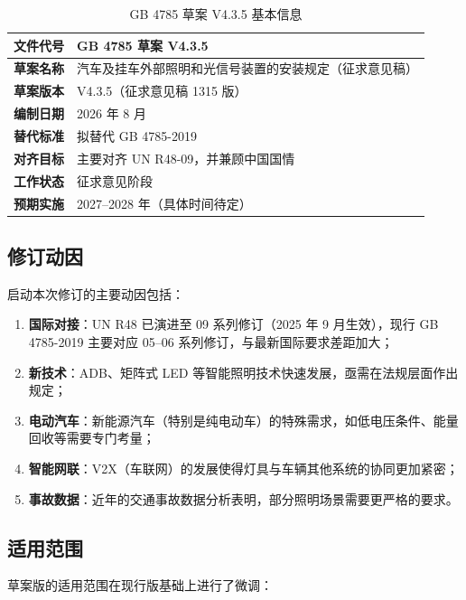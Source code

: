 \begin{table}[H]
\centering
\caption{GB 4785 草案 V4.3.5 基本信息}
\begin{tabularx}{\textwidth}{|l|X|}
\hline
\textbf{文件代号} & GB 4785 草案 V4.3.5 \\
\hline
\textbf{草案名称} & 汽车及挂车外部照明和光信号装置的安装规定（征求意见稿） \\
\hline
\textbf{草案版本} & V4.3.5（征求意见稿 1315 版） \\
\hline
\textbf{编制日期} & 2026 年 8 月 \\
\hline
\textbf{替代标准} & 拟替代 GB 4785-2019 \\
\hline
\textbf{对齐目标} & 主要对齐 UN R48-09，并兼顾中国国情 \\
\hline
\textbf{工作状态} & 征求意见阶段 \\
\hline
\textbf{预期实施} & 2027--2028 年（具体时间待定） \\
\hline
\end{tabularx}
\end{table}

\subsection{修订动因}

启动本次修订的主要动因包括：

\begin{enumerate}[leftmargin=2em]
    \item \textbf{国际对接}：UN R48 已演进至 09 系列修订（2025 年 9 月生效），现行 GB 4785-2019 主要对应 05--06 系列修订，与最新国际要求差距加大；
    \item \textbf{新技术}：ADB、矩阵式 LED 等智能照明技术快速发展，亟需在法规层面作出规定；
    \item \textbf{电动汽车}：新能源汽车（特别是纯电动车）的特殊需求，如低电压条件、能量回收等需要专门考量；
    \item \textbf{智能网联}：V2X（车联网）的发展使得灯具与车辆其他系统的协同更加紧密；
    \item \textbf{事故数据}：近年的交通事故数据分析表明，部分照明场景需要更严格的要求。
\end{enumerate}

\subsection{适用范围}

草案版的适用范围在现行版基础上进行了微调：

